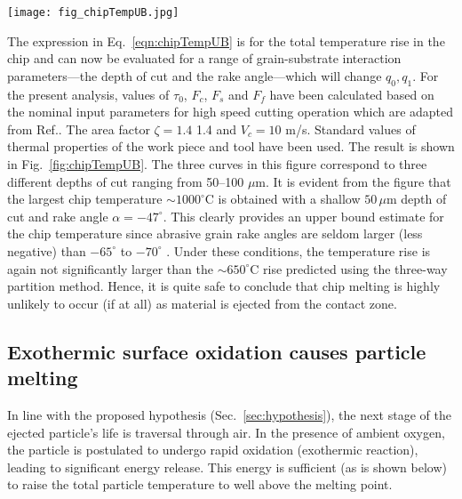\documentclass[11pt]{article}
\begin{document}
\begin{figure*}[h!]
   \centering
  \texttt{[image: fig\_chipTempUB.jpg]}
  \caption{Upper bound estimates of chip temperatures for three different depths of cut of the abrasive. The curves show that a maximum of 1000$^\circ$C is possible only at the extremely unlikely cutting geometry of $\alpha = -47^\circ$.}
  \label{fig:chipTempUB}
\end{figure*}

The expression in Eq.~\ref{eqn:chipTempUB} is for the total temperature rise in the chip and can now be evaluated for a range of grain-substrate interaction parameters---the depth of cut and the rake angle---which will change $q_0, q_1$. For the present analysis, values of $\tau_0$, $F_c$, $F_s$ and $F_f$ have been calculated based on the nominal input parameters for high speed cutting operation which are adapted from Ref.\cite{Shaw2005}. The area factor $\zeta = 1.4$ 1.4 and $V_c= 10$ m/s. Standard values of thermal properties of the work piece and tool have been used. The result is shown in Fig.~\ref{fig:chipTempUB}. The three curves in this figure correspond to three different depths of cut ranging from 50--100 $\mu$m. It is evident from the figure that the largest chip temperature $\sim 1000^\circ$C is obtained with a shallow $50\,\mu$m depth of cut and rake angle $\alpha = -47^\circ$. This clearly provides an upper bound estimate for the chip temperature since abrasive grain rake angles are seldom larger (less negative) than $-65^\circ$ to $-70^\circ$ \cite{malkin2007thermal}. Under these conditions, the temperature rise is again not significantly larger than the $\sim 650^\circ$C rise predicted using the three-way partition method. Hence, it is quite safe to conclude that chip melting is highly unlikely to occur (if at all) as material is ejected from the contact zone.

\subsection{Exothermic surface oxidation causes particle melting}
In line with the proposed hypothesis (Sec.~\ref{sec:hypothesis}), the next stage of the ejected particle's life is traversal through air. In the presence of ambient oxygen, the particle is postulated to undergo rapid oxidation (exothermic reaction), leading to significant energy release. This energy is sufficient (as is shown below) to raise the total particle temperature to well above the melting point.
\end{document}
